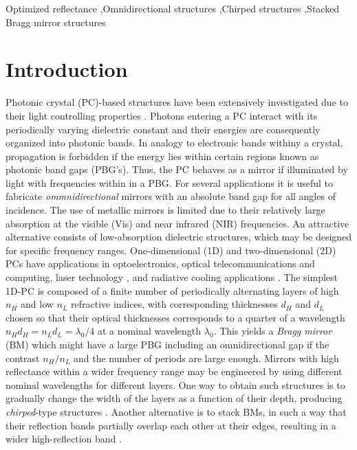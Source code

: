 \documentclass[a4paper,fleqn]{cas-sc}
\begin{document}
	\begin{keywords}
		Optimized reflectance \sep Omnidirectional structures \sep Chirped structures \sep Stacked Bragg mirror structures
	\end{keywords}
	
	\maketitle
	
	\section{Introduction}
	Photonic crystal (PC)-based structures have been extensively investigated due
	to their light controlling properties \cite{Joannopoulos2008,Goyal2018}.
	Photons entering a PC interact with its periodically varying dielectric constant and
	their energies are consequently organized into photonic bands. In
	analogy to electronic bands withiny a
	crystal, propagation is forbidden if the energy lies
	within certain regions known as photonic band gaps (PBG's). Thus, the
	PC behaves as a mirror if illuminated by light with frequencies
	within in a PBG. For several applications it is useful to fabricate
	{\em ommnidirectional} mirrors with an absolute band gap for all angles of incidence.
	The use of metallic
	mirrors is limited due to their relatively large absorption at the
	visible (Vis) and near infrared (NIR) frequencies.  An attractive alternative
	consists of low-absorption dielectric
	structures,  which may be designed for specific frequency
	ranges. One-dimensional (1D) and two-dimensional (2D) PCs have
	applications in optoelectronics, optical telecommunications and computing,
	laser technology \cite{Lopez2003,Masaya2010}, and radiative cooling applications
	\cite{Kumar2020}. The simplest 1D-PC is composed of a finite number
	of periodically alternating
	layers of high $n_{H}$ and low $n_{L}$ refractive indices, with
	corresponding thicknesses $d_H$ and $d_L$ chosen so that their optical
	thicknesses corresponds to a quarter of a wavelength
	$n_{H}d_{H}=n_{L}d_{L}=\lambda_{0}/4$ at a nominal
	wavelength $\lambda_{0}$. This yields a {\em Bragg mirror} (BM)
	which might have a large PBG including an omnidirectional gap if the contrast $n_H/n_L$
	and the number of periods are large enough. Mirrors with high
	reflectance within a wider frequency range may be engineered by
	using different nominal wavelengths for different layers.
	One way to obtain such structures is to gradually change the width of
	the layers as a function of their depth, producing
	\textit{chirped}-type structures \cite{Zipock1997}.
	Another alternative is to stack BMs, in such a way that their reflection bands partially
	overlap each other at their edges, resulting in a wider high-reflection band \cite{Xifre2009}.
	
\end{document}
